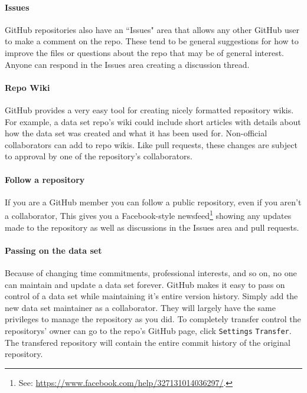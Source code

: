 \documentclass[twocolumn]{article}\usepackage{graphicx, color}
\begin{document}
\paragraph{Issues}

GitHub repositories also have an ``Issues" area that allows any other GitHub user to make a comment on the repo. These tend to be general suggestions for how to improve the files or questions about the repo that may be of general interest. Anyone can respond in the Issues area creating a discussion thread.

\paragraph{Repo Wiki}

GitHub provides a very easy tool for creating nicely formatted repository wikis. For example, a data set repo's wiki could include short articles with details about how the data set was created and what it has been used for. Non-official collaborators can add to repo wikis. Like pull requests, these changes are subject to approval by one of the repository's collaborators.

\paragraph{Follow a repository}

If you are a GitHub member you can follow a public repository, even if you aren't a collaborator, This gives you a Facebook-style newsfeed\footnote{See: \url{https://www.facebook.com/help/327131014036297/}.} showing any updates made to the repository as well as discussions in the Issues area and pull requests. 

\paragraph{Passing on the data set}

Because of changing time commitments, professional interests, and so on, no one can maintain and update a data set forever. GitHub makes it easy to pass on control of a data set while maintaining it's entire version history. Simply add the new data set maintainer as a collaborator. They will largely have the same privileges to manage the repository as you did. To completely transfer control the repositorys' owner can go to the repo's GitHub page, click \texttt{Settings} \textrightarrow{} \texttt{Transfer}. The transfered repository will contain the entire commit history of the original repository.
\end{document}
